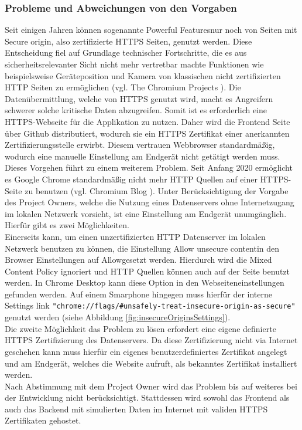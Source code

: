 \subsubsection{Probleme und Abweichungen von den Vorgaben}
Seit einigen Jahren können sogenannte \grqq Powerful Features\grqq\space nur noch von Seiten mit \grqq Secure origin\grqq , also zertifizierte HTTPS Seiten, genutzt werden. Diese Entscheidung fiel auf Grundlage technischer Fortschritte, die es aus sicherheitsrelevanter Sicht nicht mehr vertretbar machte Funktionen wie beispielsweise Geräteposition und Kamera von klassischen nicht zertifizierten HTTP Seiten zu ermöglichen (vgl. The Chromium Projects \cite{CameraHTTPSOnly}). Die Datenübermittlung, welche von HTTPS genutzt wird, macht es Angreifern schwerer solche kritische Daten abzugreifen. Somit ist es erforderlich eine HTTPS-Webseite für die Applikation zu nutzen. Daher wird die Frontend Seite über Github distributiert, wodurch sie ein HTTPS Zertifikat einer anerkannten Zertifizierungsstelle erwirbt. Diesem vertrauen Webbrowser standardmäßig, wodurch eine manuelle Einstellung am Endgerät nicht getätigt werden muss.\\
Dieses Vorgehen führt zu einem weiterem Problem. Seit Anfang 2020 ermöglicht es Google Chrome standardmäßig nicht mehr HTTP Quellen auf einer HTTPS-Seite zu benutzen (vgl. Chromium Blog \cite{MixedSourcesPolicy}). Unter Berücksichtigung der Vorgabe des Project Owners, welche die Nutzung eines Datenservers ohne Internetzugang im lokalen Netzwerk vorsieht, ist eine Einstellung am Endgerät unumgänglich. Hierfür gibt es zwei Möglichkeiten.\\
Einerseits kann, um einen unzertifizierten HTTP Datenserver im lokalen Netzwerk benutzen zu können, die Einstellung \grqq Allow unsecure content\grqq\space in den Browser Einstellungen auf \grqq Allow\grqq\space gesetzt werden. Hierdurch wird die Mixed Content Policy ignoriert und HTTP Quellen können auch auf der Seite benutzt werden. In Chrome Desktop kann diese Option in den Webseiteneinstellungen gefunden werden. Auf einem Smarphone hingegen muss hierfür der interne Settings link \verb|"chrome://flags/#unsafely-treat-insecure-origin-as-secure"| genutzt werden (siehe Abbildung \ref{fig:insecureOriginsSettings}).\\
Die zweite Möglichkeit das Problem zu lösen erfordert eine eigene definierte HTTPS Zertifizierung des Datenservers. Da diese Zertifizierung nicht via Internet geschehen kann muss hierfür ein eigenes benutzerdefiniertes Zertifikat angelegt und am Endgerät, welches die Website aufruft, als bekanntes Zertifikat installiert werden.\\ 
Nach Abstimmung mit dem Project Owner wird das Problem bis auf weiteres bei der Entwicklung nicht berücksichtigt. Stattdessen wird sowohl das Frontend als auch das Backend mit simulierten Daten im Internet mit validen HTTPS Zertifikaten gehostet.

